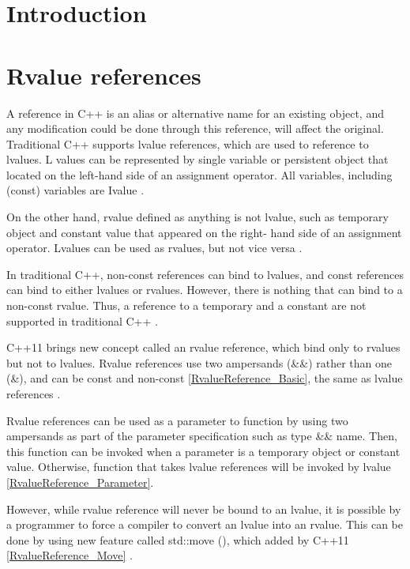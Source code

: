 \documentclass[11pt]{report}
\begin{document}
\section{Introduction}
\label{sec: Introduction}

\section{Rvalue references}
\label{section: Rvalue references}
A reference in C++ is an alias or alternative name for an existing object, and any modification could be done through this reference, will affect the original. Traditional C++ supports lvalue references, which are used to reference to lvalues. L values can be represented by single variable or persistent object that located on the left-hand side of an assignment operator. All variables, including (const) variables are Ivalue \cite{Gregorie:professionalcpp}.
\newline

On the other hand, rvalue defined as anything is not lvalue, such as temporary object and constant value that appeared on the right- hand side of an assignment operator.  Lvalues can be used as rvalues, but not vice versa \cite{Gregorie:professionalcpp}.
\newline

In traditional C++, non-const references can bind to lvalues, and const references can bind to either lvalues or rvalues. However, there is nothing that can bind to a non-const rvalue. Thus, a reference to a temporary and a constant are not supported in traditional C++ \cite{Stroustrup:2012:Cpp11}.
\newline

C++11 brings new concept called an rvalue reference, which bind only to rvalues but not to lvalues. Rvalue references use two ampersands (\&\&) rather than one (\&), and can be const and non-const \ref{RvalueReference_Basic}, the same as lvalue references \cite{Gregorie:professionalcpp}.
\newline

Rvalue references can be used as a parameter to function by using two ampersands as part of the parameter specification such as type \&\& name. Then, this function can be invoked when a parameter is a temporary object or constant value. Otherwise, function that takes lvalue references will be invoked by lvalue \ref{RvalueReference_Parameter}.
\newline

However, while rvalue reference will never be bound to an lvalue, it is possible by a programmer to force a compiler to convert an lvalue into an rvalue. This can be done by using new feature called std::move (), which added by C++11 \ref{RvalueReference_Move} \cite{Gregorie:professionalcpp}.
\newline
\end{document}
